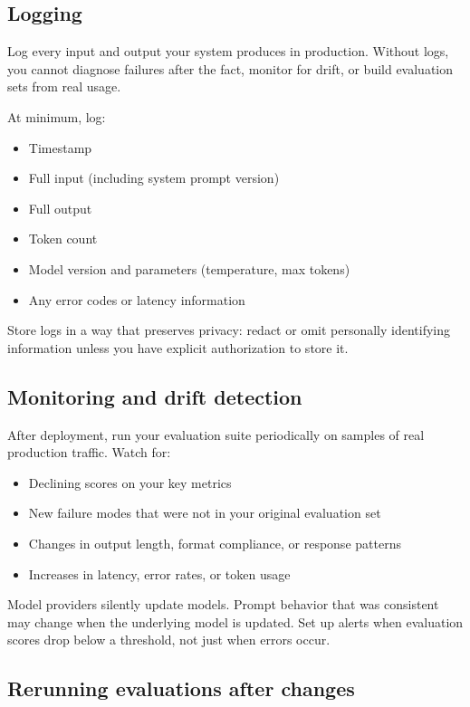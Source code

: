 \subsection{Logging}

Log every input and output your system produces in production. Without logs, you cannot diagnose failures after the fact, monitor for drift, or build evaluation sets from real usage.

At minimum, log:
\begin{itemize}[noitemsep,topsep=0pt]
  \item Timestamp
  \item Full input (including system prompt version)
  \item Full output
  \item Token count
  \item Model version and parameters (temperature, max tokens)
  \item Any error codes or latency information
\end{itemize}

Store logs in a way that preserves privacy: redact or omit personally identifying information unless you have explicit authorization to store it.

\subsection{Monitoring and drift detection}

After deployment, run your evaluation suite periodically on samples of real production traffic. Watch for:

\begin{itemize}[noitemsep,topsep=0pt]
  \item Declining scores on your key metrics
  \item New failure modes that were not in your original evaluation set
  \item Changes in output length, format compliance, or response patterns
  \item Increases in latency, error rates, or token usage
\end{itemize}

Model providers silently update models. Prompt behavior that was consistent may change when the underlying model is updated. Set up alerts when evaluation scores drop below a threshold, not just when errors occur.

\subsection{Rerunning evaluations after changes}

